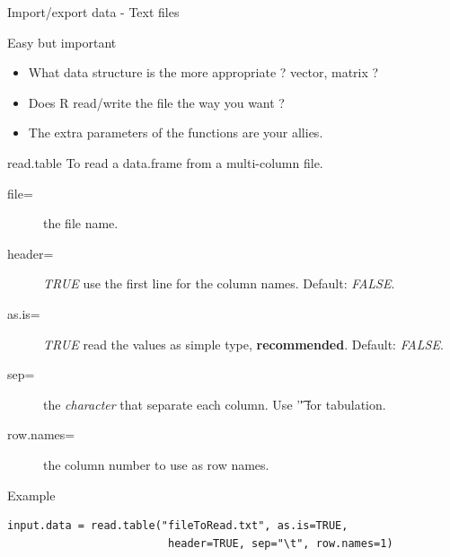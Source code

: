 \documentclass[10pt]{beamer}
\begin{document}
\begin{frame}[fragile,shrink=10]{Import/export data - Text files}
  \begin{block}{Easy but important}
    \begin{itemize}
    \item What data structure is the more appropriate ? {\sf vector}, {\sf matrix} ?
    \item Does R read/write the file the way you want ?
    \item The extra parameters of the functions are your allies.
    \end{itemize}
  \end{block}
  \begin{block}{{\sf read.table}}
    To read a {\sf data.frame} from a multi-column file.
    \begin{description}
    \item[file=] the file name.
    \item[header=] {\it TRUE} use the first line for the column names. Default: {\it FALSE}.
    \item[as.is=] {\it TRUE} read the values as simple type, {\bf recommended}. Default: {\it FALSE}. 
    \item[sep=] the {\it character} that separate each column. Use '\t' for tabulation.
    \item[row.names=] the column number to use as row names. 
    \end{description}
  \end{block}
  \begin{exampleblock}{Example}
\begin{verbatim}
input.data = read.table("fileToRead.txt", as.is=TRUE,
                         header=TRUE, sep="\t", row.names=1)
\end{verbatim}  
  \end{exampleblock}
\end{frame}

\end{document}
